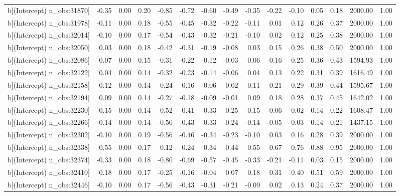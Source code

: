 \begin{table}[ht]
\begin{tabular}{rrrrrrrrrrrrrrr}
  b[(Intercept) n\_obs:31870] & -0.35 & 0.00 & 0.20 & -0.85 & -0.72 & -0.60 & -0.49 & -0.35 & -0.22 & -0.10 & 0.05 & 0.18 & 2000.00 & 1.00 \\ 
  b[(Intercept) n\_obs:31978] & -0.11 & 0.00 & 0.18 & -0.55 & -0.45 & -0.32 & -0.22 & -0.11 & 0.01 & 0.12 & 0.26 & 0.37 & 2000.00 & 1.00 \\ 
  b[(Intercept) n\_obs:32014] & -0.10 & 0.00 & 0.17 & -0.54 & -0.43 & -0.32 & -0.21 & -0.10 & 0.02 & 0.12 & 0.25 & 0.38 & 2000.00 & 1.00 \\ 
  b[(Intercept) n\_obs:32050] & 0.03 & 0.00 & 0.18 & -0.42 & -0.31 & -0.19 & -0.08 & 0.03 & 0.15 & 0.26 & 0.38 & 0.50 & 2000.00 & 1.00 \\ 
  b[(Intercept) n\_obs:32086] & 0.07 & 0.00 & 0.15 & -0.31 & -0.22 & -0.12 & -0.03 & 0.06 & 0.16 & 0.25 & 0.36 & 0.43 & 1594.93 & 1.00 \\ 
  b[(Intercept) n\_obs:32122] & 0.04 & 0.00 & 0.14 & -0.32 & -0.23 & -0.14 & -0.06 & 0.04 & 0.13 & 0.22 & 0.31 & 0.39 & 1616.49 & 1.00 \\ 
  b[(Intercept) n\_obs:32158] & 0.12 & 0.00 & 0.14 & -0.24 & -0.16 & -0.06 & 0.02 & 0.11 & 0.21 & 0.29 & 0.39 & 0.44 & 1595.67 & 1.00 \\ 
  b[(Intercept) n\_obs:32194] & 0.09 & 0.00 & 0.14 & -0.27 & -0.18 & -0.09 & -0.01 & 0.09 & 0.18 & 0.28 & 0.37 & 0.45 & 1642.02 & 1.00 \\ 
  b[(Intercept) n\_obs:32230] & -0.15 & 0.00 & 0.14 & -0.52 & -0.41 & -0.33 & -0.25 & -0.15 & -0.06 & 0.02 & 0.14 & 0.22 & 1608.47 & 1.00 \\ 
  b[(Intercept) n\_obs:32266] & -0.14 & 0.00 & 0.14 & -0.50 & -0.43 & -0.33 & -0.24 & -0.14 & -0.05 & 0.03 & 0.14 & 0.21 & 1437.15 & 1.00 \\ 
  b[(Intercept) n\_obs:32302] & -0.10 & 0.00 & 0.19 & -0.56 & -0.46 & -0.34 & -0.23 & -0.10 & 0.03 & 0.16 & 0.28 & 0.39 & 2000.00 & 1.00 \\ 
  b[(Intercept) n\_obs:32338] & 0.55 & 0.00 & 0.17 & 0.12 & 0.24 & 0.34 & 0.44 & 0.55 & 0.67 & 0.76 & 0.88 & 0.95 & 2000.00 & 1.00 \\ 
  b[(Intercept) n\_obs:32374] & -0.33 & 0.00 & 0.18 & -0.80 & -0.69 & -0.57 & -0.45 & -0.33 & -0.21 & -0.11 & 0.03 & 0.15 & 2000.00 & 1.00 \\ 
  b[(Intercept) n\_obs:32410] & 0.18 & 0.00 & 0.17 & -0.25 & -0.16 & -0.04 & 0.07 & 0.18 & 0.31 & 0.40 & 0.51 & 0.59 & 2000.00 & 1.00 \\ 
  b[(Intercept) n\_obs:32446] & -0.10 & 0.00 & 0.17 & -0.56 & -0.43 & -0.31 & -0.21 & -0.09 & 0.02 & 0.13 & 0.24 & 0.37 & 2000.00 & 1.00 \\ 

\end{tabular}
\end{table}
